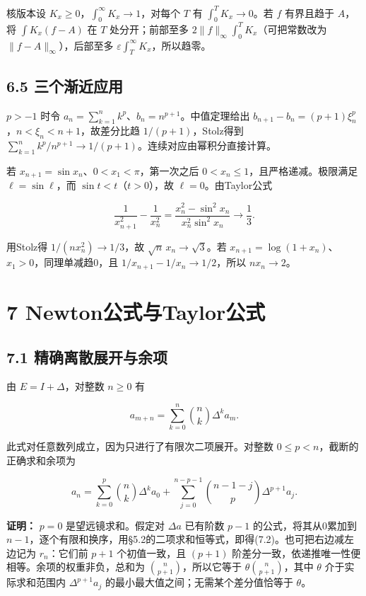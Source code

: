 \documentclass[11pt,a4paper]{article}
\begin{document}
核版本设 \(K_x\ge0\)，\(\int_0^\infty K_x\to1\)，对每个 \(T\) 有
\(\int_0^TK_x\to0\)。若 \(f\) 有界且趋于 \(A\)，将 \(\int K_x(f-A)\) 在
\(T\) 处分开；前部至多 \(2\|f\|_\infty\int_0^TK_x\)（可把常数改为
\(\|f-A\|_\infty\)），后部至多
\(\varepsilon\int_T^\infty K_x\)，所以趋零。

\subsection{6.5
三个渐近应用}\label{ux4e09ux4e2aux6e10ux8fd1ux5e94ux7528}

\(p>-1\) 时令 \(a_n=\sum_{k=1}^nk^p\)、\(b_n=n^{p+1}\)。中值定理给出
\(b_{n+1}-b_n=(p+1)\xi_n^p\)，\(n<\xi_n<n+1\)，故差分比趋
\(1/(p+1)\)，Stolz得到
\(\sum_{k=1}^nk^p/n^{p+1}\to1/(p+1)\)。连续对应由幂积分直接计算。

若 \(x_{n+1}=\sin x_n\)、\(0<x_1<\pi\)，第一次之后
\(0<x_n\le1\)，且严格递减。极限满足 \(\ell=\sin\ell\)，而
\(\sin t<t\)（\(t>0\)），故 \(\ell=0\)。由Taylor公式

\[
\frac1{x_{n+1}^2}-\frac1{x_n^2}
=\frac{x_n^2-\sin^2x_n}{x_n^2\sin^2x_n}\to\frac13.
\]

用Stolz得 \(1/(nx_n^2)\to1/3\)，故 \(\sqrt n\,x_n\to\sqrt3\)。若
\(x_{n+1}=\log(1+x_n)\)、\(x_1>0\)，同理单减趋0，且
\(1/x_{n+1}-1/x_n\to1/2\)，所以 \(nx_n\to2\)。

\clearpage

\section{7
Newton公式与Taylor公式}\label{newtonux516cux5f0fux4e0etaylorux516cux5f0f}

\subsection{7.1
精确离散展开与余项}\label{ux7cbeux786eux79bbux6563ux5c55ux5f00ux4e0eux4f59ux9879}

由 \(E=I+\Delta\)，对整数 \(n\ge0\) 有

\[
a_{m+n}=\sum_{k=0}^n\binom nk\Delta^ka_m.\tag{7.1}
\]

此式对任意数列成立，因为只进行了有限次二项展开。对整数
\(0\le p<n\)，截断的正确求和余项为

\[
a_n=\sum_{k=0}^p\binom nk\Delta^ka_0
+\sum_{j=0}^{n-p-1}\binom{n-1-j}{p}\Delta^{p+1}a_j.\tag{7.2}
\]

\textbf{证明：} \(p=0\) 是望远镜求和。假定对 \(\Delta a\) 已有阶数
\(p-1\) 的公式，将其从0累加到
\(n-1\)，逐个有限和换序，用§5.2的二项求和恒等式，即得(7.2)。也可把右边减左边记为
\(r_n\)：它们前 \(p+1\) 个初值一致，且 \((p+1)\)
阶差分一致，依递推唯一性便相等。余项的权重非负，总和为
\(\binom n{p+1}\)，所以它等于 \(\theta\binom n{p+1}\)，其中 \(\theta\)
介于实际求和范围内 \(\Delta^{p+1}a_j\)
的最小最大值之间；无需某个差分值恰等于 \(\theta\)。
\end{document}
